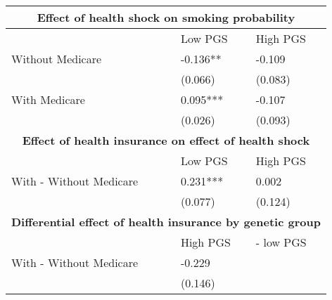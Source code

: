 % 
\begin{tabular}{lll}
  \toprule
  \multicolumn{3}{c}{ \textbf{Effect of health shock on smoking probability}} \\
 \midrule
 & Low PGS & High PGS \\ 
   \midrule
Without Medicare & -0.136** & -0.109 \\ 
   & (0.066) & (0.083) \\ 
  With Medicare & 0.095*** & -0.107 \\ 
   & (0.026) & (0.093) \\ 
   \toprule \multicolumn{3}{c}{ \textbf{Effect of health insurance on effect of health shock}} \\
 \midrule
 & Low PGS & High PGS \\ 
   \midrule
With - Without Medicare & 0.231*** & 0.002 \\ 
   & (0.077) & (0.124) \\ 
   \toprule \multicolumn{3}{c}{ \textbf{Differential effect of health insurance by genetic group}} \\
 \midrule
 & High PGS  & - low PGS \\ 
   \midrule
With - Without Medicare & -0.229 &  \\ 
   & (0.146) &  \\ 
  \end{tabular}
